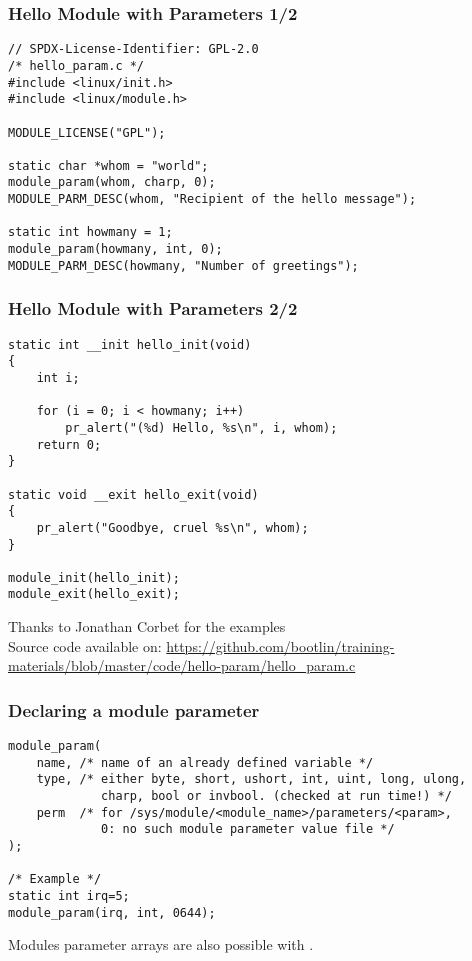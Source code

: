 \begin{frame}[fragile]
  \frametitle{Hello Module with Parameters 1/2}
\begin{verbatim}
// SPDX-License-Identifier: GPL-2.0
/* hello_param.c */
#include <linux/init.h>
#include <linux/module.h>

MODULE_LICENSE("GPL");

static char *whom = "world";
module_param(whom, charp, 0);
MODULE_PARM_DESC(whom, "Recipient of the hello message");

static int howmany = 1;
module_param(howmany, int, 0);
MODULE_PARM_DESC(howmany, "Number of greetings");
\end{verbatim}
\end{frame}

\begin{frame}[fragile]
  \frametitle{Hello Module with Parameters 2/2}
\begin{verbatim}
static int __init hello_init(void)
{
    int i;

    for (i = 0; i < howmany; i++)
        pr_alert("(%d) Hello, %s\n", i, whom);
    return 0;
}

static void __exit hello_exit(void)
{
    pr_alert("Goodbye, cruel %s\n", whom);
}

module_init(hello_init);
module_exit(hello_exit);
\end{verbatim}
\footnotesize
Thanks to Jonathan Corbet for the examples\\
\tiny
Source code available on:
\url{https://github.com/bootlin/training-materials/blob/master/code/hello-param/hello_param.c}
\end{frame}

\begin{frame}[fragile]
  \frametitle{Declaring a module parameter}

\begin{verbatim}
module_param(
    name, /* name of an already defined variable */
    type, /* either byte, short, ushort, int, uint, long, ulong,
             charp, bool or invbool. (checked at run time!) */
    perm  /* for /sys/module/<module_name>/parameters/<param>,
             0: no such module parameter value file */
);

/* Example */
static int irq=5;
module_param(irq, int, 0644);
\end{verbatim}
Modules parameter arrays are also possible with
.
\end{frame}
